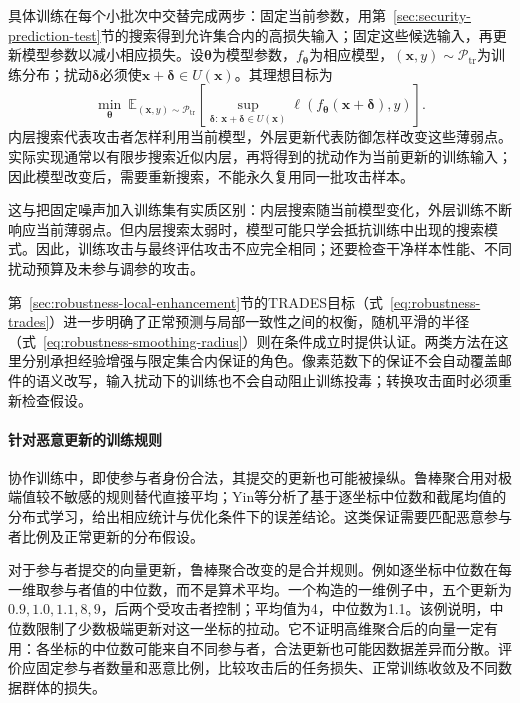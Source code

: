 具体训练在每个小批次中交替完成两步：固定当前参数，用第~\ref{sec:security-prediction-test}节的搜索得到允许集合内的高损失输入；固定这些候选输入，再更新模型参数以减小相应损失。设$\bm\theta$为模型参数，$f_{\bm\theta}$为相应模型，$(\bm x,y)\sim\mathcal P_{\mathrm{tr}}$为训练分布；扰动$\bm\delta$必须使$\bm x+\bm\delta\in U(\bm x)$。其理想目标为
\begin{equation}
 \min_{\bm\theta}\ \mathbb E_{(\bm x,y)\sim\mathcal P_{\mathrm{tr}}}
 \left[\sup_{\bm\delta:\,\bm x+\bm\delta\in U(\bm x)}
  \ell(f_{\bm\theta}(\bm x+\bm\delta),y)\right].
 \label{eq:security-adversarial-training}
\end{equation}
内层搜索代表攻击者怎样利用当前模型，外层更新代表防御怎样改变这些薄弱点。实际实现通常以有限步搜索近似内层，再将得到的扰动作为当前更新的训练输入；因此模型改变后，需要重新搜索，不能永久复用同一批攻击样本。

这与把固定噪声加入训练集有实质区别：内层搜索随当前模型变化，外层训练不断响应当前薄弱点。但内层搜索太弱时，模型可能只学会抵抗训练中出现的搜索模式。因此，训练攻击与最终评估攻击不应完全相同；还要检查干净样本性能、不同扰动预算及未参与调参的攻击。

第~\ref{sec:robustness-local-enhancement}节的TRADES目标（式~\eqref{eq:robustness-trades}）进一步明确了正常预测与局部一致性之间的权衡，随机平滑的半径（式~\eqref{eq:robustness-smoothing-radius}）则在条件成立时提供认证。两类方法在这里分别承担经验增强与限定集合内保证的角色。像素范数下的保证不会自动覆盖邮件的语义改写，输入扰动下的训练也不会自动阻止训练投毒；转换攻击面时必须重新检查假设。

\paragraph{针对恶意更新的训练规则}

协作训练中，即使参与者身份合法，其提交的更新也可能被操纵。鲁棒聚合用对极端值较不敏感的规则替代直接平均；Yin等分析了基于逐坐标中位数和截尾均值的分布式学习，给出相应统计与优化条件下的误差结论。这类保证需要匹配恶意参与者比例及正常更新的分布假设。

对于参与者提交的向量更新，鲁棒聚合改变的是合并规则。例如逐坐标中位数在每一维取参与者值的中位数，而不是算术平均。一个构造的一维例子中，五个更新为$0.9,1.0,1.1,8,9$，后两个受攻击者控制；平均值为4，中位数为1.1。该例说明，中位数限制了少数极端更新对这一坐标的拉动。它不证明高维聚合后的向量一定有用：各坐标的中位数可能来自不同参与者，合法更新也可能因数据差异而分散。评价应固定参与者数量和恶意比例，比较攻击后的任务损失、正常训练收敛及不同数据群体的损失。

